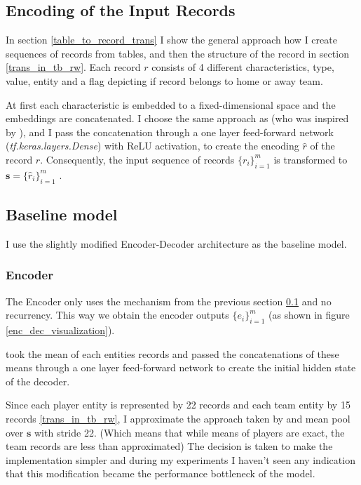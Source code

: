 \subsection{Encoding of the Input Records} \label{enc_in_rec}

In section \ref{table_to_record_trans} I show the general approach how I create sequences of records from tables, and then the structure of the record in section \ref{trans_in_tb_rw}. Each record $r$ consists of 4 different characteristics, type, value, entity and a flag depicting if record belongs to home or away team.

At first each characteristic is embedded to a fixed-dimensional space and the embeddings are concatenated. I choose the same approach as \citep{wiseman2017} (who was inspired by \citep{yang2016referenceaware}), and I pass the concatenation through a one layer feed-forward network (\emph{tf.keras.layers.Dense}) with ReLU activation, to create the encoding $\hat{r}$ of the record $r$. Consequently, the input sequence of records $\{r_i\}_{i=1}^m$ is transformed to $\mathbf{s} = \{ \hat{r}_i \}_{i=1}^m$ .

\subsection{Baseline model}

I use the slightly modified Encoder-Decoder architecture as the baseline model.

\subsubsection{Encoder}

The Encoder only uses the mechanism from the previous section \ref{enc_in_rec} and no recurrency. This way we obtain the encoder outputs $\{e_i\}_{i=1}^m$ (as shown in figure \ref{enc_dec_visualization}).

\citep{wiseman2017} took the mean of each entities records and passed the concatenations of these means through a one layer feed-forward network to create the initial hidden state of the decoder.

Since each player entity is represented by 22 records and each team entity by 15 records \ref{trans_in_tb_rw}, I approximate the approach taken by \citep{wiseman2017} and mean pool over $\mathbf{s}$ with stride 22. (Which means that while means of players are exact, the team records are less than approximated) The decision is taken to make the implementation simpler and during my experiments I haven't seen any indication that this modification became the performance bottleneck of the model.

